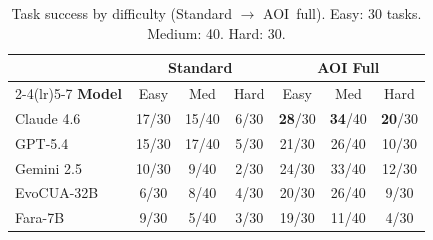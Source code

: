 \documentclass[11pt]{article}
\begin{document}
\begin{table}[!h]
\centering
\caption{Task success by difficulty (Standard $\to$ AOI~full).
Easy: 30 tasks. Medium: 40. Hard: 30.}
\label{tab:difficulty}
\small
\begin{tabular}{@{}l ccc ccc@{}}
\toprule
& \multicolumn{3}{c}{\textbf{Standard}} & \multicolumn{3}{c}{\textbf{AOI Full}} \\
\cmidrule(lr){2-4}\cmidrule(lr){5-7}
\textbf{Model} & Easy & Med & Hard & Easy & Med & Hard \\
\midrule
Claude 4.6 & 17/30 & 15/40 & 6/30 & \textbf{28}/30 & \textbf{34}/40 & \textbf{20}/30 \\
GPT-5.4 & 15/30 & 17/40 & 5/30 & 21/30 & 26/40 & 10/30 \\
Gemini 2.5 & 10/30 & 9/40 & 2/30 & 24/30 & 33/40 & 12/30 \\
EvoCUA-32B & 6/30 & 8/40 & 4/30 & 20/30 & 26/40 & 9/30 \\
Fara-7B & 9/30 & 5/40 & 3/30 & 19/30 & 11/40 & 4/30 \\
\bottomrule
\end{tabular}
\end{table}
\end{document}
